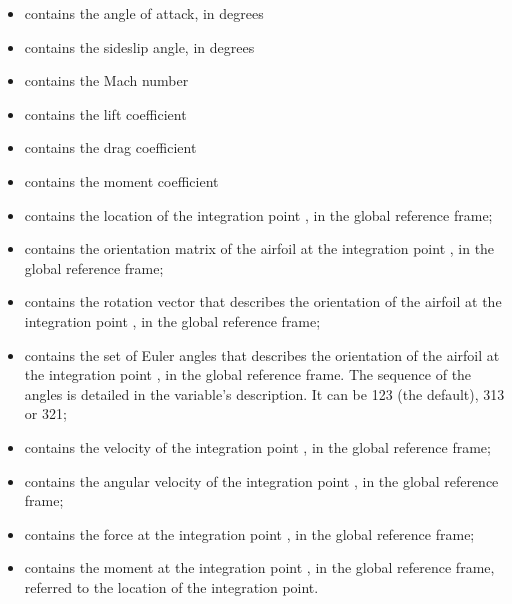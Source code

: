 \begin{itemize}
\item {} contains the angle of attack, in degrees

\item {} contains the sideslip angle, in degrees

\item {} contains the Mach number

\item {} contains the lift coefficient

\item {} contains the drag coefficient

\item {} contains the moment coefficient

\item {} contains the location
of the integration point , in the global reference frame;

\item {} contains the orientation matrix
of the airfoil at the integration point , in the global reference frame;

\item {} contains the rotation vector
that describes the orientation of the airfoil at the integration point ,
in the global reference frame;

\item {} contains the set of Euler angles
that describes the orientation of the airfoil at the integration point ,
in the global reference frame.
The sequence of the angles is detailed in the variable's description.
It can be 123 (the default), 313 or 321;

\item {} contains the velocity
of the integration point , in the global reference frame;

\item {} contains the angular velocity
of the integration point , in the global reference frame;

\item {} contains the force
at the integration point , in the global reference frame;

\item {} contains the moment
at the integration point , in the global reference frame,
referred to the location of the integration point.
\end{itemize}

